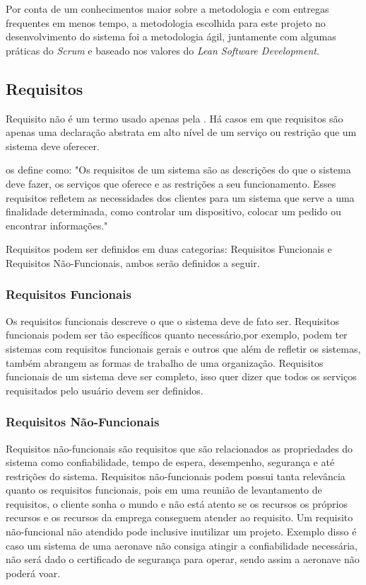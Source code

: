 Por conta de um conhecimentos maior sobre a metodologia e com entregas frequentes em menos tempo, a metodologia escolhida para este projeto no desenvolvimento do sistema foi a metodologia ágil, juntamente com algumas práticas do \textit{Scrum} e baseado nos valores do \textit{Lean Software Development}.  

\subsection{Requisitos}
\label{sec:requisitos_introducao}

Requisito não é um termo usado apenas pela \imprimircurso. Há casos em que requisitos são apenas uma declaração abstrata em alto nível de um serviço ou restrição que um sistema deve oferecer.

\cite{sommerville} os define como: "Os requisitos de um sistema são as descrições do que o sistema deve fazer, os serviços que oferece e as restrições a seu funcionamento. Esses requisitos refletem as necessidades dos clientes para um sistema que serve a uma finalidade determinada, como controlar um dispositivo, colocar um pedido ou encontrar informações."

Requisitos podem ser definidos em duas categorias: Requisitos Funcionais e Requisitos Não-Funcionais, ambos serão definidos a seguir.

\subsubsection{Requisitos Funcionais}
\label{sec:requisitos_funcionais_introducao}

Os requisitos funcionais descreve o que o sistema deve de fato ser. Requisitos funcionais podem ser tão específicos quanto necessário,por exemplo, podem ter sistemas com requisitos funcionais gerais e outros que além de refletir os sistemas, também abrangem as formas de trabalho de uma organização. Requisitos funcionais de um sistema deve ser completo, isso quer dizer que todos os serviços requisitados pelo usuário devem ser definidos.

\subsubsection{Requisitos Não-Funcionais}
\label{sec:requisitos_nao_funcionais_introducao}

Requisitos não-funcionais são requisitos que são relacionados as propriedades do sistema como confiabilidade, tempo de espera, desempenho, segurança e até restrições do sistema. Requisitos não-funcionais podem possui tanta relevância quanto os requisitos funcionais, pois em uma reunião de levantamento de requisitos, o cliente sonha o mundo e não está atento se os recursos os próprios recursos e os recursos da emprega conseguem atender ao requisito. Um requisito não-funcional não atendido pode inclusive inutilizar um projeto. Exemplo disso é caso um sistema de uma aeronave não consiga atingir a confiabilidade necessária, não será dado o certificado de segurança para operar, sendo assim a aeronave não poderá voar. 

